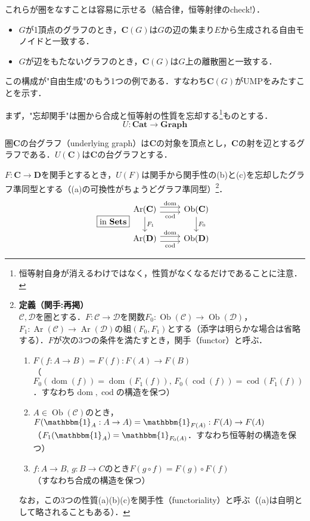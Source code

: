 \documentclass[dvipdfmx,a4j,10pt]{jsarticle}
\theoremstyle{mystyle1}
\theoremstyle{mystyle2}
\renewcommand{\labelenumi}{\ensuremath{\blacksquare}}
\renewcommand{\labelenumi}{(\arabic{enumi})}%
\DeclareMathOperator{\Ob}{Ob}
\DeclareMathOperator{\Ar}{Ar}
\DeclareMathOperator{\dom}{dom}
\DeclareMathOperator{\cod}{cod}
\newcommand{\Sets}{\mathbf{Sets}}
\newcommand{\Cat}{\mathbf{Cat}}
\newcommand{\Graph}{\mathbf{Graph}}
\begin{document}
	これらが圏をなすことは容易に示せる（結合律，恒等射律のcheck!）．

	\begin{itemize}
		\item $G$が1頂点のグラフのとき，$\textbf{C}(G)$は$G$の辺の集まり$E$から生成される自由モノイドと一致する．
		\item $G$が辺をもたないグラフのとき，$\textbf{C}(G)$は$G$上の離散圏と一致する．
	\end{itemize}


	この構成が"自由生成"のもう1つの例である．すなわち$\mathbf{C}(G)$がUMPをみたすことを示す．

	まず，"忘却関手"は圏から合成と恒等射の性質を忘却する\footnote{恒等射自身が消えるわけではなく，性質がなくなるだけであることに注意．}ものとする．
	\[
		U:\Cat\to \Graph
	\]


	圏$\mathbf{C}$の台グラフ（underlying graph）は$\mathbf{C}$の対象を頂点とし，$\mathbf{C}$の射を辺とするグラフである．$U(\mathbf{C})$は$\mathbf{C}$の台グラフとする．


$F:\mathbf{C}\to \mathbf{D}$を関手とするとき，$U(F)$は関手から関手性の(b)と(c)を忘却したグラフ準同型とする（(a)の可換性がちょうどグラフ準同型）\footnote{
		\textbf{定義（関手:再掲）}\\
		$\mathcal{C},\mathcal{D}$を圏とする．$F:\mathcal{C}\to\mathcal{D}$を関数$F_0:\Ob(\mathcal{C})\to\Ob(\mathcal{D})$，$F_1:\Ar(\mathcal{C})\to\Ar(\mathcal{D})$の組$(F_0,F_1)$とする（添字は明らかな場合は省略する）．$F$が次の3つの条件を満たすとき，関手（functor）と呼ぶ．
		\begin{enumerate}\renewcommand{\labelenumi}{(\alph{enumi})}
			\item $F(f:A\to B)=F(f):F(A)\to F(B)$\\
			      （$F_0(\dom(f))=\dom(F_1(f)),\,F_0(\cod(f))=\cod(F_1(f))$．すなわち$\dom,\cod$の構造を保つ）
			\item $A\in\Ob(\mathcal{C})$のとき，$F(\mathbbm{1}_A:A\to A)=\mathbbm{1}_{F(A)}:F(A)\to F(A)$\\
			      （$F_1(\mathbbm{1}_A)=\mathbbm{1}_{F_0(A)}$．すなわち恒等射の構造を保つ）
			\item $f:A\to B,\, g:B\to C$のとき$F(g\circ f)=F(g)\circ F(f)$\\
			      （すなわち合成の構造を保つ）
		\end{enumerate}
		なお，この3つの性質(a)(b)(c)を関手性（functoriality）と呼ぶ（(a)は自明として略されることもある）．
	}．
	\begin{equation}
		\fbox{in $\Sets$}
		\begin{tikzcd}
			\Ar(\mathbf{C}) \arrow[r,yshift=0.7ex,"\dom"] \arrow[r,yshift=-0.7ex,"\cod"'] \arrow[d,"F_1"] & \Ob(\mathbf{C}) \arrow[d,"F_0"]\\
			\Ar(\mathbf{D}) \arrow[r,yshift=0.7ex,"\dom"] \arrow[r,yshift=-0.7ex,"\cod"'] & \Ob(\mathbf{D})
		\end{tikzcd}
	\end{equation}
\end{document}
